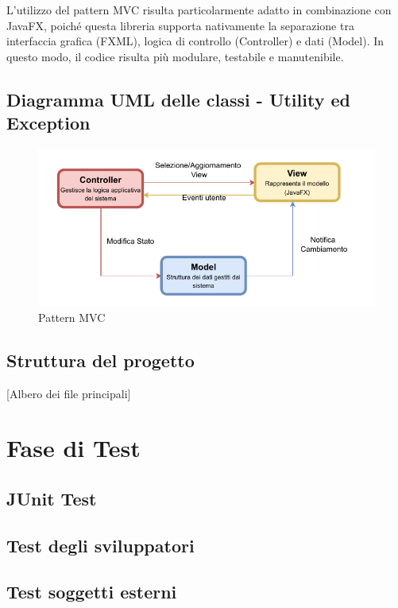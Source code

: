 \documentclass[a4paper]{article}
\begin{document}
\skip

L'utilizzo del pattern MVC risulta particolarmente adatto in combinazione con JavaFX, poiché questa libreria supporta nativamente la separazione tra interfaccia grafica (FXML), logica di controllo (Controller) e dati (Model). In questo modo, il codice risulta più modulare, testabile e manutenibile.

\subsection{Diagramma UML delle classi - Utility ed Exception}
\begin{figure}[H]
    \centering
    \includegraphics[width=0.7 \textwidth]{./figures/mvc_template}
    \caption{Pattern MVC}
    \label{fig:mvc_template}
\end{figure}

\subsection{Struttura del progetto}
[Albero dei file principali]


\section{Fase di Test}
\subsection{JUnit Test}
\subsection{Test degli sviluppatori}

\subsection{Test soggetti esterni}
\end{document}

